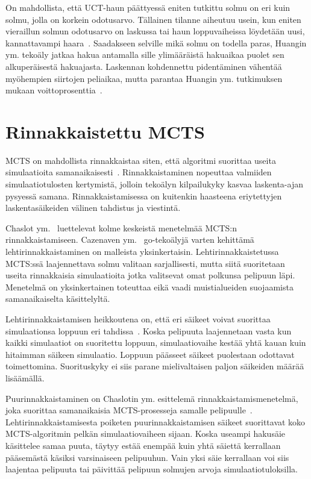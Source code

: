 \documentclass[12pt,finnish]{tktltiki2}
\theoremstyle{definition}
\theoremstyle{remark}
\begin{document}
On mahdollista, että UCT-haun päättyessä eniten tutkittu solmu on eri kuin solmu, jolla on korkein odotusarvo. Tällainen tilanne aiheutuu usein, kun eniten vieraillun solmun odotusarvo on laskussa tai haun loppuvaiheissa löydetään uusi, kannattavampi haara~\cite{huang}. Saadakseen selville mikä solmu on todella paras, Huangin ym. tekoäly jatkaa hakua antamalla sille ylimääräistä hakuaikaa puolet sen alkuperäisestä hakuajasta. Laskennan kohdennettu pidentäminen vähentää myöhempien siirtojen peliaikaa, mutta parantaa Huangin ym. tutkimuksen mukaan voittoprosenttia~\cite{huang}.

\section{Rinnakkaistettu MCTS}

MCTS on mahdollista rinnakkaistaa siten, että algoritmi suorittaa useita simulaatioita samanaikaisesti~\cite{browne, cazenave}. Rinnakkaistaminen nopeuttaa valmiiden simulaatiotulosten kertymistä, jolloin tekoälyn kilpailukyky kasvaa laskenta-ajan pysyessä samana. Rinnakkaistamisessa on kuitenkin haasteena eriytettyjen laskentasäikeiden välinen tahdistus ja viestintä.

Chaslot ym.~\cite{chaslot} luettelevat kolme keskeistä menetelmää MCTS:n rinnakkaistamiseen. Cazenaven ym.~\cite{cazenave} go-tekoälyjä varten kehittämä lehtirinnakkaistaminen on malleista yksinkertaisin. Lehtirinnakkaistetussa MCTS:ssä laajennettava solmu valitaan sarjallisesti, mutta siitä suoritetaan useita rinnakkaisia simulaatioita jotka valitsevat omat polkunsa pelipuun läpi. Menetelmä on yksinkertainen toteuttaa eikä vaadi muistialueiden suojaamista samanaikaiselta käsittelyltä.

Lehtirinnakkaistamisen heikkoutena on, että eri säikeet voivat suorittaa simulaationsa loppuun eri tahdissa~\cite{chaslot}. Koska pelipuuta laajennetaan vasta kun kaikki simulaatiot on suoritettu loppuun, simulaatiovaihe kestää yhtä kauan kuin hitaimman säikeen simulaatio. Loppuun päässeet säikeet puolestaan odottavat toimettomina. Suorituskyky ei siis parane mielivaltaisen paljon säikeiden määrää lisäämällä.

Puurinnakkaistaminen on Chaslotin ym. esittelemä rinnakkaistamismenetelmä, joka suorittaa samanaikaisia MCTS-prosesseja samalle pelipuulle~\cite{chaslot}. Lehtirinnakkaistamisesta poiketen puurinnakkaistamisen säikeet suorittavat koko MCTS-algoritmin pelkän simulaatiovaiheen sijaan. Koska useampi hakusäie käsittelee samaa puuta, täytyy estää enempää kuin yhtä säiettä kerrallaan pääsemästä käsiksi varsinaiseen pelipuuhun. Vain yksi säie kerrallaan voi siis laajentaa pelipuuta tai päivittää pelipuun solmujen arvoja simulaatiotuloksilla.
\end{document}
